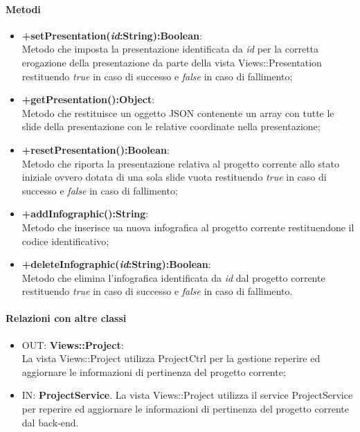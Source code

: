 	\paragraph{Metodi}
	\begin{itemize}
	  	\item \textbf{+setPresentation(\textit{id}:String):Boolean}:\\
		  	Metodo che imposta la presentazione identificata da  \textit{id} per la corretta erogazione della presentazione da parte della vista Views::Presentation restituendo \textit{true} in caso di successo e \textit{false} in caso di fallimento;
	  	\item \textbf{+getPresentation():Object}:\\
		  	Metodo che restituisce un oggetto JSON contenente un array con tutte le slide della presentazione con le relative coordinate nella presentazione;
	 	\item \textbf{+resetPresentation():Boolean}:\\
			Metodo che riporta la presentazione relativa al progetto corrente allo stato iniziale ovvero dotata di una sola slide vuota restituendo \textit{true} in caso di successo e \textit{false} in caso di fallimento;
		\item \textbf{+addInfographic():String}:\\
			Metodo che inserisce ua nuova infografica al progetto corrente restituendone il codice identificativo;
		\item \textbf{+deleteInfographic(\textit{id}:String):Boolean}:\\
	  		Metodo che elimina l'infografica identificata da \textit{id} dal progetto corrente restituendo \textit{true} in caso di successo e \textit{false} in caso di fallimento.


	\end{itemize}
	\paragraph{Relazioni con altre classi}
	\begin{itemize}
	  \item OUT: \textbf{Views::Project}:\\
		La vista Views::Project utilizza ProjectCtrl per la gestione reperire ed aggiornare le informazioni di pertinenza del progetto corrente;
	  \item IN: \textbf{ProjectService}.
		La vista Views::Project utilizza il service ProjectService per reperire ed aggiornare le informazioni di pertinenza del progetto corrente dal back-end.
	\end{itemize}

